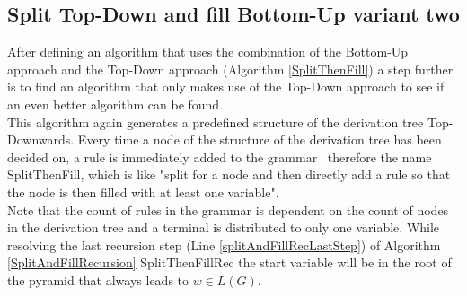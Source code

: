 \begin{testexample}
\begin{minipage}{6in}
{
			}
			
		\end{minipage}
		\label{IllustrationAlgorithmSplitThenFillPart6}
\end{testexample}

\clearpage

\subsection{Split Top-Down and fill Bottom-Up variant two}
After defining an algorithm that uses the combination of the Bottom-Up approach and the Top-Down approach (Algorithm \ref{SplitThenFill}) a step further is to find an algorithm that only makes use of the Top-Down approach to see if an even better algorithm can be found.\\
This algorithm again generates a predefined structure of the derivation tree Top-Downwards. Every time a node of the structure of the derivation tree has been decided on, a rule is immediately added to the grammar \textendash~therefore the name SplitThenFill, which is like "split for a node and then directly add a rule so that the node is then filled with at least one variable". \\
Note that the count of rules in the grammar is dependent on the count of nodes in the derivation tree and a terminal is distributed to only one variable. While resolving the last recursion step (Line \ref{splitAndFillRecLastStep}) of Algorithm \ref{SplitAndFillRecursion} SplitThenFillRec the start variable will be in the root of the pyramid that always leads to $w \in L(G)$.\\

